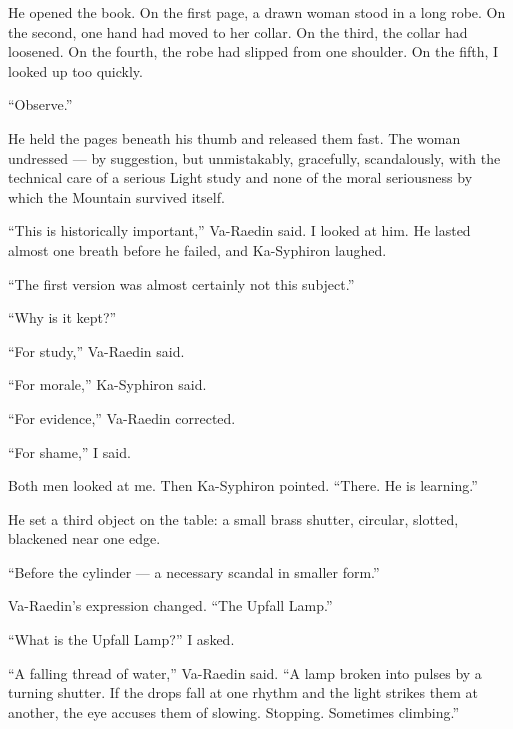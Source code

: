 He opened the book.
On the first page, a drawn woman stood in a long robe. On the second, one hand had moved to her collar. On the third, the collar had loosened. On the fourth, the robe had slipped from one shoulder. On the fifth, I looked up too quickly.\par

``Observe.''\par

He held the pages beneath his thumb and released them fast. The woman undressed --- by suggestion, but unmistakably, gracefully, scandalously, with the technical care of a serious Light study and none of the moral seriousness by which the Mountain survived itself.\par

``This is historically important,'' Va-Raedin said.
I looked at him. He lasted almost one breath before he failed, and Ka-Syphiron laughed.\par

``The first version was almost certainly not this subject.''\par

``Why is it kept?''\par

``For study,'' Va-Raedin said.\par

``For morale,'' Ka-Syphiron said.\par

``For evidence,'' Va-Raedin corrected.\par

``For shame,'' I said.\par

Both men looked at me. Then Ka-Syphiron pointed. ``There. He is learning.''\par

He set a third object on the table: a small brass shutter, circular, slotted, blackened near one edge.\par

``Before the cylinder --- a necessary scandal in smaller form.''\par

Va-Raedin's expression changed. ``The Upfall Lamp.''\par

``What is the Upfall Lamp?'' I asked.\par

``A falling thread of water,'' Va-Raedin said. ``A lamp broken into pulses by a turning shutter. If the drops fall at one rhythm and the light strikes them at another, the eye accuses them of slowing. Stopping. Sometimes climbing.''\par

